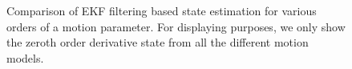 \documentclass[conference]{IEEEtran}
\begin{document}
\begin{figure}
\caption{Comparison of EKF filtering based state estimation for various orders of a motion parameter. For displaying purposes, we only show the zeroth order derivative state from all the different motion models.}
\label{fig:order_model}
\end{figure}

%  




\end{document}

